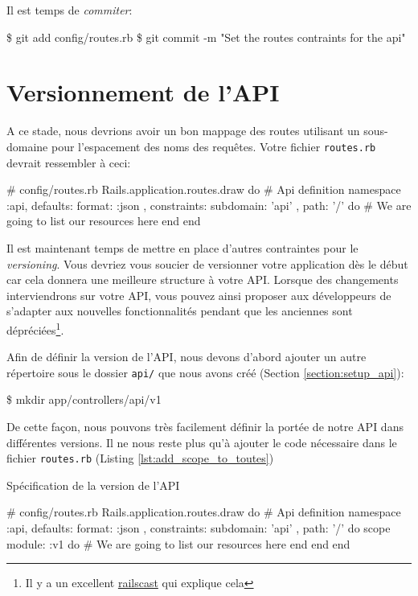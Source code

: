 \documentclass[]{report}
\begin{document}
      Il est temps de \textit{commiter}:

      \begin{bashcode}
      \$ git add config/routes.rb
      \$ git commit -m "Set the routes contraints for the api"
      \end{bashcode}

  \section{Versionnement de l'API}\label{section:api_versioning}

    A ce stade, nous devrions avoir un bon mappage des routes utilisant un sous-domaine pour l'espacement des noms des requêtes. Votre fichier \verb|routes.rb| devrait ressembler à ceci:

    \begin{rubycode}
    # config/routes.rb
    Rails.application.routes.draw do
      # Api definition
      namespace :api, defaults: { format: :json }, constraints: { subdomain: 'api' }, path: '/'  do
        # We are going to list our resources here
      end
    end
    \end{rubycode}

    Il est maintenant temps de mettre en place d'autres contraintes pour le \textit{versioning}. Vous devriez vous soucier de versionner votre application dès le début car cela donnera une meilleure structure à votre API. Lorsque des changements interviendrons sur votre API, vous pouvez ainsi proposer aux développeurs de s'adapter aux nouvelles fonctionnalités pendant que les anciennes sont dépréciées\footnote{Il y a un excellent \href{http://railscasts.com/episodes/350-rest-api-versioning}{railscast} qui explique cela}.

    Afin de définir la version de l'API, nous devons d'abord ajouter un autre répertoire sous le dossier \verb|api/| que nous avons créé (Section \ref{section:setup_api}):

    \begin{bashcode}
    \$ mkdir app/controllers/api/v1
    \end{bashcode}

    De cette façon, nous pouvons très facilement définir la portée de notre API dans différentes versions. Il ne nous reste plus qu'à ajouter le code nécessaire dans le fichier \verb|routes.rb| (Listing \ref{lst:add_scope_to_toutes})

    \begin{listing}
      \caption{Spécification de la version de l'API}
      \label{lst:add_scope_to_toutes}
      \begin{rubycode}[language=ruby, ]
      # config/routes.rb
      Rails.application.routes.draw do
        # Api definition
        namespace :api, defaults: { format: :json }, constraints: { subdomain: 'api' }, path: '/'  do
          scope module: :v1 do
            # We are going to list our resources here
          end
        end
      end
      \end{rubycode}
    \end{listing}
\end{document}
